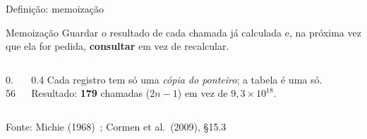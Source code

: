 \documentclass[aspectratio=169]{beamer}
\newcommand{\fonte}[1]{\vfill\hfill{\scriptsize\textcolor{UFSGray}{Fonte: #1}}}
\begin{document}
\begin{frame}{Definição: memoização}
  \begin{block}{Memoização}
    \small Guardar o resultado de cada chamada já calculada e, na próxima vez
    que ela for pedida, \textbf{consultar} em vez de recalcular.
  \end{block}
  \begin{columns}[c]
    \begin{column}{0.56\textwidth}
      \begin{center}
      \end{center}
    \end{column}
    \begin{column}{0.4\textwidth}
      \small Cada registro tem só uma \emph{cópia do ponteiro}; a tabela é
      uma só. Resultado: \textbf{179} chamadas ($2n - 1$) em vez de
      $9{,}3 \times 10^{18}$.
    \end{column}
  \end{columns}
  \fonte{Michie (1968)~\cite{michie1968memo};
    Cormen et al.\ (2009), §15.3~\cite{cormen2009introduction}}
\end{frame}
\end{document}
